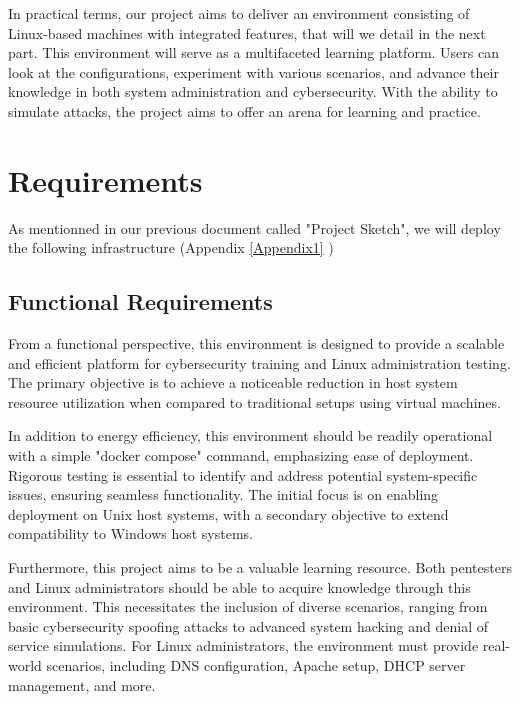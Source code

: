 \documentclass[a4paper,11pt,singlespacing]{article}
\begin{document}
In practical terms, our project aims to deliver an environment consisting of Linux-based machines with integrated features, that will we detail in the next part. This environment will serve as a multifaceted learning platform. Users can look at the configurations, experiment with various scenarios, and advance their knowledge in both system administration and cybersecurity. With the ability to simulate attacks, the project aims to offer an arena for learning and practice.

\section{Requirements}
As mentionned in our previous document called "Project Sketch", we will deploy the following infrastructure (Appendix \ref{Appendix1} )

\subsection{Functional Requirements}
From a functional perspective, this environment is designed to provide a scalable and efficient platform for cybersecurity training and Linux administration testing. The primary objective is to achieve a noticeable reduction in host system resource utilization when compared to traditional setups using virtual machines.\par

In addition to energy efficiency, this environment should be readily operational with a simple "docker compose" command, emphasizing ease of deployment. Rigorous testing is essential to identify and address potential system-specific issues, ensuring seamless functionality. The initial focus is on enabling deployment on Unix host systems, with a secondary objective to extend compatibility to Windows host systems.\par

Furthermore, this project aims to be a valuable learning resource. Both pentesters and Linux administrators should be able to acquire knowledge through this environment. This necessitates the inclusion of diverse scenarios, ranging from basic cybersecurity spoofing attacks to advanced system hacking and denial of service simulations. For Linux administrators, the environment must provide real-world scenarios, including DNS configuration, Apache setup, DHCP server management, and more.\par
\end{document}
